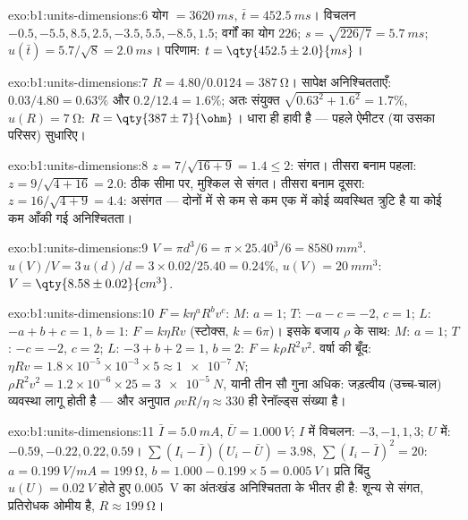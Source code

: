 \begin{solution}{exo:b1:units-dimensions:6}
योग $= \qty{3620}{ms}$, $\bar t = \qty{452.5}{ms}$। विचलन
$-0.5, -5.5, 8.5, 2.5, -3.5, 5.5, -8.5, 1.5$; वर्गों का योग $226$;
$s = \sqrt{226/7} = \qty{5.7}{ms}$; $u(\bar t) = 5.7/\sqrt8 = \qty{2.0}{ms}$।
परिणाम: $t = \qty{452.5\pm2.0}{ms}$।
\end{solution}

\begin{solution}{exo:b1:units-dimensions:7}
$R = 4.80/0.0124 = \qty{387}{\ohm}$।
सापेक्ष अनिश्चितताएँ: $0.03/4.80 = 0.63\%$ और $0.2/12.4 = 1.6\%$;
अतः संयुक्त $\sqrt{0.63^2 + 1.6^2} = 1.7\%$,
$u(R) = \qty{7}{\ohm}$: $R = \qty{387\pm7}{\ohm}$। धारा ही हावी है
--- पहले ऐमीटर (या उसका परिसर) सुधारिए।
\end{solution}

\begin{solution}{exo:b1:units-dimensions:8}
$z = 7/\sqrt{16 + 9} = 1.4 \leq 2$: संगत।
तीसरा बनाम पहला: $z = 9/\sqrt{4 + 16} = 2.0$: ठीक सीमा पर, मुश्किल से
संगत। तीसरा बनाम दूसरा: $z = 16/\sqrt{4 + 9} = 4.4$: असंगत
--- दोनों में से कम से कम एक में कोई व्यवस्थित त्रुटि है या कोई कम आँकी गई
अनिश्चितता।
\end{solution}

\begin{solution}{exo:b1:units-dimensions:9}
$V = \pi d^3/6 = \pi \times 25.40^3/6 = \qty{8580}{mm^3}$.
$u(V)/V = 3\,u(d)/d = 3 \times 0.02/25.40 = 0.24\%$,
$u(V) = \qty{20}{mm^3}$: $V = \qty{8.58\pm0.02}{cm^3}$.
\end{solution}

\begin{solution}{exo:b1:units-dimensions:10}
$F = k\eta^a R^b v^c$: $M$: $a = 1$; $T$: $-a - c = -2$, $c = 1$;
$L$: $-a + b + c = 1$, $b = 1$: $F = k\eta R v$ (स्टोक्स, $k = 6\pi$)।
इसके बजाय $\rho$ के साथ: $M$: $a = 1$; $T$: $-c = -2$, $c = 2$; $L$:
$-3 + b + 2 = 1$, $b = 2$: $F = k\rho R^2 v^2$.
वर्षा की बूँद: $\eta R v = 1.8\times10^{-5} \times 10^{-3} \times 5 \approx
\qty{1e-7}{N}$; $\rho R^2 v^2 = 1.2 \times 10^{-6} \times 25 =
\qty{3e-5}{N}$, यानी तीन सौ गुना अधिक: जड़त्वीय (उच्च-चाल) व्यवस्था लागू
होती है --- और अनुपात $\rho v R/\eta \approx 330$ ही रेनॉल्ड्स
संख्या है।
\end{solution}

\begin{solution}{exo:b1:units-dimensions:11}
$\bar I = \qty{5.0}{mA}$, $\bar U = \qty{1.000}{V}$; $I$ में विचलन:
$-3, -1, 1, 3$; $U$ में: $-0.59, -0.22, 0.22, 0.59$।
$\sum (I_i - \bar I)(U_i - \bar U) = 3.98$, $\sum (I_i - \bar I)^2 = 20$:
$a = \qty{0.199}{V/mA} = \qty{199}{\ohm}$, $b = 1.000 - 0.199 \times 5 =
\qty{0.005}{V}$। प्रति बिंदु $u(U) = \qty{0.02}{V}$ होते हुए
\qty{0.005}{V} का अंतःखंड अनिश्चितता के भीतर ही है: शून्य से संगत, प्रतिरोधक
ओमीय है, $R \approx \qty{199}{\ohm}$।
\end{solution}

